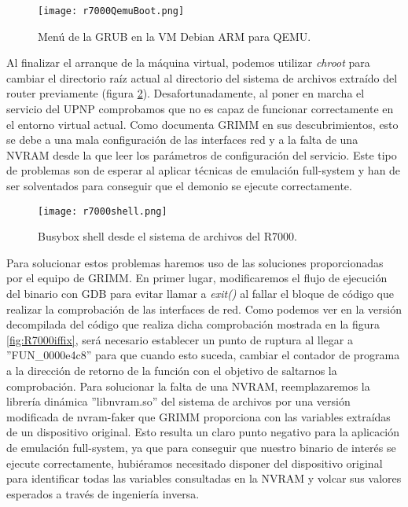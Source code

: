 \begin{figure}[H]
    \centering
    \texttt{[image: r7000QemuBoot.png]}
    \caption{Menú de la GRUB en la VM Debian ARM para QEMU.}
    \label{fig:R7000QemuBoot}
\end{figure}

Al finalizar el arranque de la máquina virtual, podemos utilizar \textit{chroot} para cambiar el directorio raíz actual al directorio 
del sistema de archivos extraído del router previamente (figura \ref{fig:R7000shell}). Desafortunadamente, al poner en marcha el 
servicio del UPNP comprobamos que no es capaz de funcionar correctamente en el entorno virtual actual. Como documenta GRIMM\cite{r7000GRIMM}
en sus descubrimientos, esto se debe a una mala configuración de las interfaces red y a la falta de una NVRAM desde la que leer los 
parámetros de configuración del servicio. Este tipo de problemas son de esperar al aplicar técnicas de emulación full-system y han 
de ser solventados para conseguir que el demonio se ejecute correctamente.

\begin{figure}[H]
    \centering
    \texttt{[image: r7000shell.png]}
    \caption{Busybox shell desde el sistema de archivos del R7000.}
    \label{fig:R7000shell}
\end{figure}

Para solucionar estos problemas haremos uso de las soluciones proporcionadas por el equipo de GRIMM\cite{r7000GRIMM}. En primer
lugar, modificaremos el flujo de ejecución del binario con GDB para evitar llamar a \textit{exit()} al fallar el bloque de código 
que realizar la comprobación de las interfaces de red. Como podemos ver en la versión decompilada del código que realiza dicha 
comprobación mostrada en la figura \ref{fig:R7000iffix}, será necesario establecer un punto de ruptura al llegar a ''FUN\_0000e4c8''
para que cuando esto suceda, cambiar el contador de programa a la dirección de retorno de la función con el objetivo de saltarnos 
la comprobación. Para solucionar la falta de una NVRAM, reemplazaremos la librería dinámica ''libnvram.so'' del sistema de archivos 
por una versión modificada de nvram-faker\cite{nvram} que GRIMM proporciona con las variables extraídas de un dispositivo original.
Esto resulta un claro punto negativo para la aplicación de emulación full-system, ya que para conseguir que nuestro binario de 
interés se ejecute correctamente, hubiéramos necesitado disponer del dispositivo original para identificar todas las variables 
consultadas en la NVRAM y volcar sus valores esperados a través de ingeniería inversa.

